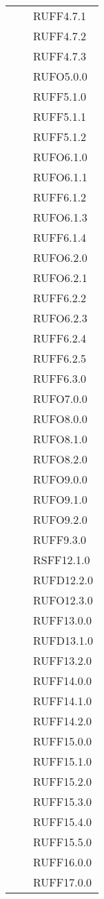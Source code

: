 \begin{center}
\begin{longtable}{lp{}l}
 &  & RUFF4.7.1 \\
 &  & RUFF4.7.2 \\
 &  & RUFF4.7.3 \\
 &  & RUFO5.0.0 \\
 &  & RUFF5.1.0 \\
 &  & RUFF5.1.1 \\
 &  & RUFF5.1.2 \\
 &  & RUFO6.1.0 \\
 &  & RUFO6.1.1 \\
 &  & RUFF6.1.2 \\
 &  & RUFO6.1.3 \\
 &  & RUFF6.1.4 \\
 &  & RUFO6.2.0 \\
 &  & RUFO6.2.1 \\
 &  & RUFF6.2.2 \\
 &  & RUFO6.2.3 \\
 &  & RUFF6.2.4 \\
 &  & RUFF6.2.5 \\
 &  & RUFF6.3.0 \\
 &  & RUFO7.0.0 \\
 &  & RUFO8.0.0 \\
 &  & RUFO8.1.0 \\
 &  & RUFO8.2.0 \\
 &  & RUFO9.0.0 \\
 &  & RUFO9.1.0 \\
 &  & RUFO9.2.0 \\
 &  & RUFF9.3.0 \\
 &  & RSFF12.1.0 \\
 &  & RUFD12.2.0 \\
 &  & RUFO12.3.0 \\
 &  & RUFF13.0.0 \\
 &  & RUFD13.1.0 \\
 &  & RUFF13.2.0 \\
 &  & RUFF14.0.0 \\
 &  & RUFF14.1.0 \\
 &  & RUFF14.2.0 \\
 &  & RUFF15.0.0 \\
 &  & RUFF15.1.0 \\
 &  & RUFF15.2.0 \\
 &  & RUFF15.3.0 \\
 &  & RUFF15.4.0 \\
 &  & RUFF15.5.0 \\
 &  & RUFF16.0.0 \\
 &  & RUFF17.0.0 \\

\end{longtable}
\end{center}
